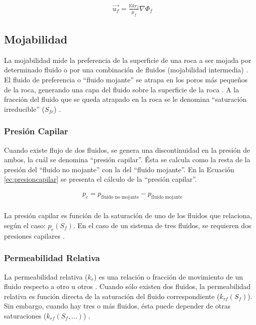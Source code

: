 \begin{align}
\label{ec:DarcyMultifasico} & \vec{u_{f}}=\frac{\mathbb{K}kr_{f}}{\mu_{f} } \nabla{\Phi_{f}}
\end{align}

\subsection{Mojabilidad}
La mojabilidad mide la preferencia de la superficie de una roca a ser mojada por determinado fluido o por una combinación de fluidos (mojabilidad intermedia) \citep{chen2007reservoir}. El fluido de preferencia o ``fluido mojante'' se atrapa en los poros más pequeños de la roca, generando una capa del fluido sobre la superficie de la roca \citep{chen2007reservoir}. A la fracción del fluido que se queda atrapado en la roca se le denomina ``saturación irreducible'' ($S_{fc}$) \citep{chen2007reservoir}. \\

\subsubsection{Presión Capilar}
Cuando existe flujo de dos fluidos, se genera una discontinuidad en la presión de ambos, la cuál se denomina ``presión capilar''. Ésta se calcula como la resta de la presión del ``fluido no mojante'' con la del ``fluido mojante''\citep{chen2007reservoir, FANCHI2002108}. En la Ecuación \ref{ec:presioncapilar} se presenta el cálculo de la ``presión capilar''.

\begin{align}
	\label{ec:presioncapilar}&p_c = p_{\text{fluido no mojante}} - p_{\text{fluido mojante}}
\end{align}\\

La presión capilar es función de la saturación de uno de los fluidos que relaciona, según el caso: $p_c(S_{f})$. En el caso de un sistema de tres fluidos, se requieren dos presiones capilares \citep{chen2007reservoir}.

\subsubsection{Permeabilidad Relativa}
La permeabilidad relativa ($k_{r}$) es una relación o fracción de movimiento de un fluido respecto a otro u otros \citep{chen2007reservoir}. Cuando sólo existen dos fluidos, la permeabilidad relativa es función directa de la saturación del fluido correspondiente ($k_{rf}(S_{f})$). Sin embargo, cuando hay tres o más fluidos, ésta puede depender de otras saturaciones ($k_{rf}(S_{f}, ...)$) \citep{chen2007reservoir}.

